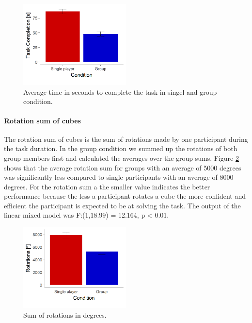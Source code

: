 \documentclass{article}
\begin{document}
\begin{figure}[h]
\centering
\includegraphics[width=0.5\textwidth]{results_duration}
\caption{Average time in seconds to complete the task in singel and group condition.} \label{fig:results_duration}
\end{figure}

\paragraph{Rotation sum of cubes}
The rotation sum of cubes is the sum of rotations made by one participant during the task duration. In the group condition we summed up the rotations of both group members first and calculated the averages over the group sums. Figure \ref{fig:results_rotations} shows that the average rotation sum for groups with an average of 5000 degrees was significantly less compared to single participants with an average of 8000 degrees. For the rotation sum a the smaller value indicates the better performance because the less a participant rotates a cube the more confident and efficient the participant is expected to be at solving the task. The output of the linear mixed model was F:(1,18.99) = 12.164, p < 0.01.

\begin{figure}[h]
\centering
\includegraphics[width=0.5\textwidth]{results_rotations}
\caption{Sum of rotations in degrees.}
\label{fig:results_rotations}
\end{figure}
\end{document}
